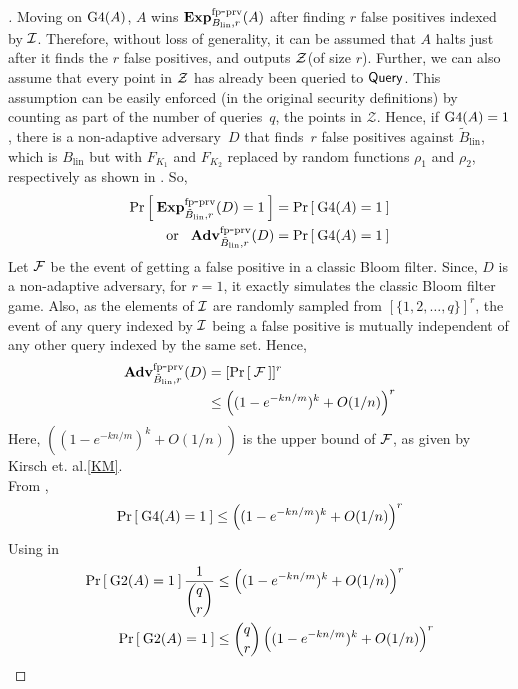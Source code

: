 \begin{proof}[]
Moving on $\text{G4}(A)$, $A$ wins $\mathrm{\mathbf{Exp}}^{\mathrm{fp\mbox{-}prv}}_{B_{\mathrm{lin}},r}(A)$ after finding $r$ false positives indexed by ${\cal I}$. Therefore, without loss of generality, it can be assumed that $A$ halts just after it finds the $r$ false positives, and outputs ${\cal Z}$(of size $r$). Further, we can also assume that every point in ${\cal Z}$ has already been queried to $\mathsf{Query}$. This assumption can be  easily enforced (in the original security definitions) by counting as part of the number of queries~$q$, the points in $\mathcal{Z}$. Hence, if $\text{G4}(A)=1$, there is a non-adaptive adversary~$D$ that finds~$r$ false positives against $\tilde{B}_{\mathrm{lin}}$, which is $B_{\mathrm{lin}}$ but with $F_{K_1}$ and $F_{K_2}$ replaced by random functions $\rho_1$ and $\rho_2$, respectively as shown in . So,
\begin{align}
\nonumber \Pr\left[\: \mathrm{\mathbf{Exp}}^{\mathrm{fp\mbox{-}prv}}_{\tilde{B}_{\mathrm{lin}},r}(D) = 1 \:\right] &= \Pr\left[\: \text{G4}(A) = 1 \:\right]\\
\mathrm{or} \hspace*{2ex} \mathrm{\mathbf{Adv}}^{\mathrm{fp\mbox{-}prv}}_{\tilde{B}_{\mathrm{lin}},r}(D) &= \Pr\left[\: \text{G4}(A) = 1 \:\right]\label{eq:7}
\end{align}
Let ${\cal F}$ be the event of getting a false positive in a classic Bloom filter. Since, $D$ is a non-adaptive adversary, for $r=1$, it exactly simulates the classic Bloom filter game. Also, as the elements of ${\cal I}$ are randomly sampled from $[\{1,2,\ldots,q\}]^r$, the event of any query indexed by ${\cal I}$ being a false positive is mutually independent of any other query indexed by the same set. Hence,
\begin{align}
\nonumber \mathrm{\mathbf{Adv}}^{\mathrm{fp\mbox{-}prv}}_{\tilde{B}_{\mathrm{lin}},r}(D) &= [\Pr\left[\: {\cal F} \:\right]]^r\\
&\leq \left( (1-e^{-kn/m})^k + O(1/n) \right)^r \label{eq:8}
\end{align}
Here, $\left( (1-e^{-kn/m})^k + O(1/n) \right)$ is the upper bound of ${\cal F}$, as given by Kirsch et. al.\ref{KM}.\\
From ,
\begin{equation}
\Pr\left[\: \text{G4}(A)=1 \:\right] \leq  \left( (1-e^{-kn/m})^k + O(1/n) \right)^r \label{eq:9}
\end{equation}
Using  in 
\begin{align}
\Pr\left[\: \text{G2}(A)=1 \:\right]\frac{1}{\dbinom{q}{r}} & \leq  \left( (1-e^{-kn/m})^k + O(1/n) \right)^r\\
\Pr\left[\: \text{G2}(A)=1 \:\right] &\leq \dbinom{q}{r}\left( (1-e^{-kn/m})^k + O(1/n) \right)^r\label{eq:10}
\end{align}


\end{proof}
